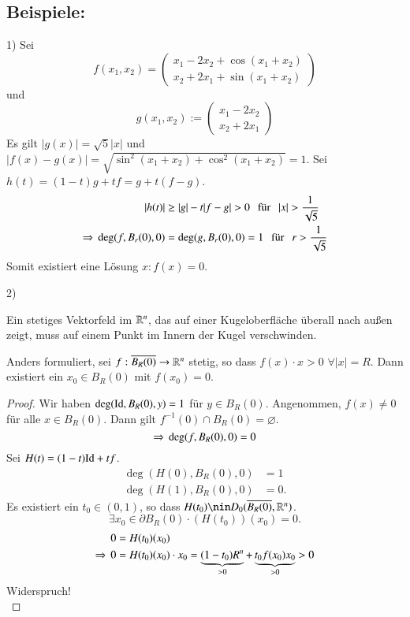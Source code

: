 \subsection*{Beispiele:}
\begin{description}
    \item{1)}
    Sei 
    \[
        f(x_1,x_2)=\begin{pmatrix} x_1-2x_2+\cos(x_1+x_2)\\x_2+2x_1+\sin(x_1+x_2) \end{pmatrix}
    \]
    und
    \[
        g(x_1,x_2):=\begin{pmatrix} x_1-2x_2 \\ x_2+2x_1 \end{pmatrix}
    \]
    Es gilt $|g(x)|=\sqrt{5} |x|$ und $|f(x)-g(x)|=\sqrt{\sin^2(x_1+x_2)+\cos^2(x_1+x_2)}=1$.
    Sei $h(t)=(1-t)g+tf=g+t(f-g)$.
    \begin{align*}
        |h(t)|&\geq |g|-t|f-g|>0 \qq \text{für} \qq |x|>\frac1{\sqrt{5}}\\
        \Ra \, \deg(f,B_r(0),0)&= \deg(g,B_r(0),0)=1 \qq \text{für} \qq r>\frac1{\sqrt{5}}
    \end{align*}
    Somit existiert eine Lösung $x:f(x)=0$.

    \item{2)}
    \begin{theorem}\label{2.10}
        Ein stetiges Vektorfeld im $\mathbb{R}^n$, das auf einer Kugeloberfläche überall nach außen zeigt, muss
        auf einem Punkt im Innern der Kugel verschwinden. 
        
        Anders formuliert, sei $f:\overline{B_R(0)} \rightarrow \mathbb{R}^n$ stetig, so dass $f(x)\cdot x>0$ $\forall |x|=R$. 
        Dann existiert ein $x_0\in B_R(0)$ mit $f(x_0)=0$.
    \end{theorem}

    \begin{proof}
        Wir haben $\deg(\mathrm{Id}, B_R(0),y)=1$ für $y\in B_R(0)$. Angenommen, $f(x)\neq 0$ für alle
        $x\in B_R(0)$. Dann gilt $f^{-1}(0)\cap B_R(0)=\varnothing$.
        \[
            \Rightarrow \, \deg(f,B_R(0),0)=0
        \]
        Sei $H(t)=(1-t)\mathrm{Id}+tf$.
        \begin{align*}
            \deg(H(0),B_R(0),0)&=1\\
            \deg(H(1),B_R(0),0)&=0.
        \end{align*}
        Es existiert ein $t_0\in (0,1)$, so dass $H(t_0)\nin D_0(\ol{B_R(0)},\R^n)$.
        \[
            \exists x_0\in \partial B_R(0)\cdot (H(t_0))(x_0)=0.
        \]
        \begin{align*}
            0&=H(t_0)(x_0)\\
            \Rightarrow \, 0&= H(t_0)(x_0)\cdot x_0= \underbrace{(1-t_0)R^n}_{>0}+\underbrace{t_0f(x_0)x_0}_{>0}
            >0
        \end{align*}
        Widerspruch!
        \[ \]
    \end{proof}
\end{description}

